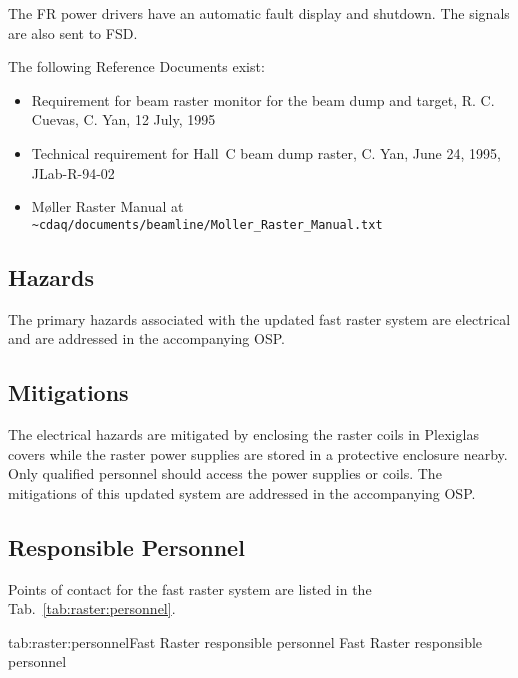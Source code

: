 {\begin{safetyen}{0}{0}
\noindent The FR power drivers have an automatic fault display and
shutdown. The signals are also sent to FSD.

The following Reference Documents exist:
\begin{itemize}
\item{Requirement for beam raster monitor for the beam dump and target,
R. C. Cuevas, C. Yan, 12 July, 1995}
\item{Technical requirement for Hall~C beam dump raster,
C. Yan, June 24, 1995, JLab-R-94-02}
\item{M\o ller Raster Manual at \nolinkurl{~cdaq/documents/beamline/Moller_Raster_Manual.txt}}
\end{itemize}

\subsection{Hazards}

The primary hazards associated with the updated fast raster system
are electrical and are addressed in the accompanying OSP.

\subsection{Mitigations}

The electrical hazards are mitigated by enclosing the raster coils in
Plexiglas covers while the raster power supplies are stored in a
protective enclosure nearby. Only qualified personnel should access
the power supplies or coils. The mitigations of this updated system
are addressed in the accompanying OSP.

\subsection{Responsible Personnel}

Points of contact for the fast raster system are listed in the Tab.~\ref{tab:raster:personnel}.
\begin{namestab}{tab:raster:personnel}{Fast Raster responsible personnel}{%
          Fast Raster responsible personnel}
\end{namestab}
\end{safetyen}

}
